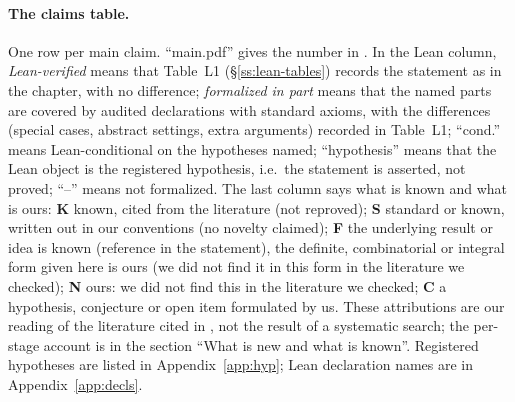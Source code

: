 \paragraph{The claims table.} One row per main claim. ``main.pdf'' gives the number in \mainpdf. In the Lean column, \emph{Lean-verified} means that Table~L1
(\S\ref{ss:lean-tables}) records the statement as in the chapter, with no difference; \emph{formalized in part} means that the
named parts are covered by audited declarations with standard axioms, with the differences (special cases, abstract
settings, extra arguments) recorded in Table~L1; ``cond.'' means Lean-conditional on the hypotheses named; ``hypothesis''
means that the Lean object is the registered hypothesis, i.e.\ the statement is asserted, not proved; ``--'' means not formalized. The last column says what is known and what is ours: \textbf{K} known,
cited from the literature (not reproved); \textbf{S} standard or known, written out in our conventions (no novelty claimed);
\textbf{F} the underlying result or idea is known (reference in the statement), the definite, combinatorial or integral form
given here is ours (we did not find it in this form in the literature we checked); \textbf{N} ours: we did not find this in the
literature we checked; \textbf{C} a hypothesis, conjecture or open item formulated by us. These attributions are our reading of
the literature cited in \mainpdf, not the result of a systematic search; the per-stage account is in the section ``What is new
and what is known''.
Registered hypotheses are listed in Appendix~\ref{app:hyp}; Lean declaration names are in Appendix~\ref{app:decls}.

